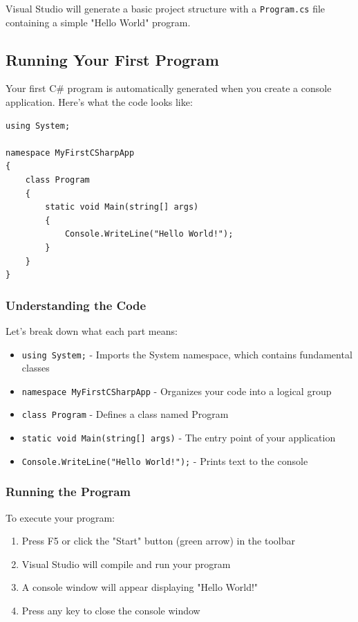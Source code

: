 \documentclass{article}
\begin{document}
Visual Studio will generate a basic project structure with a \texttt{Program.cs} file containing a simple "Hello World" program.

\subsection{Running Your First Program}
Your first C\# program is automatically generated when you create a console application. Here's what the code looks like:

\begin{verbatim}
using System;

namespace MyFirstCSharpApp
{
    class Program
    {
        static void Main(string[] args)
        {
            Console.WriteLine("Hello World!");
        }
    }
}
\end{verbatim}

\subsubsection{Understanding the Code}
Let's break down what each part means:

\begin{itemize}
    \item \texttt{using System;} - Imports the System namespace, which contains fundamental classes
    \item \texttt{namespace MyFirstCSharpApp} - Organizes your code into a logical group
    \item \texttt{class Program} - Defines a class named Program
    \item \texttt{static void Main(string[] args)} - The entry point of your application
    \item \texttt{Console.WriteLine("Hello World!");} - Prints text to the console
\end{itemize}

\subsubsection{Running the Program}
To execute your program:
\begin{enumerate}
    \item Press F5 or click the "Start" button (green arrow) in the toolbar
    \item Visual Studio will compile and run your program
    \item A console window will appear displaying "Hello World!"
    \item Press any key to close the console window
\end{enumerate}
\end{document}
